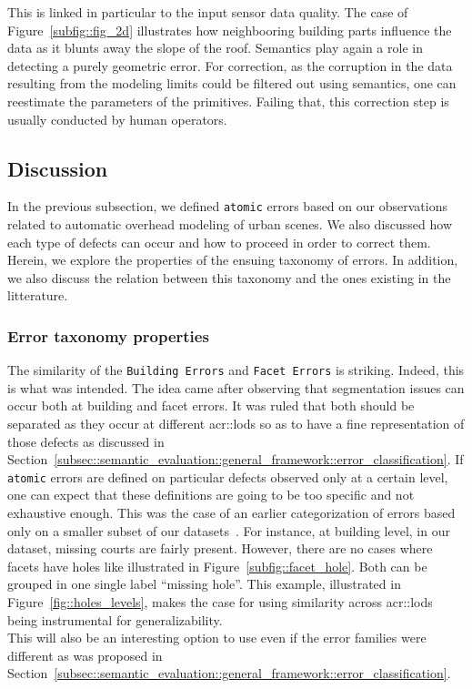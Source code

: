                 This is linked in particular to the input sensor data quality.
                The case of Figure~\ref{subfig::fig_2d} illustrates how neighbooring building parts influence the data as it blunts away the slope of the roof.
                Semantics play again a role in detecting a purely geometric error.
                For correction, as the corruption in the data resulting from the modeling limits could be filtered out using semantics, one can reestimate the parameters of the primitives.
                Failing that, this correction step is usually conducted by human operators.

    \subsection{Discussion}
        \label{subsec::semantic_evaluation::overhead::discussion}

        In the previous subsection, we defined \texttt{atomic} errors based on our observations related to automatic overhead modeling of urban scenes.
        We also discussed how each type of defects can occur and how to proceed in order to correct them.
        Herein, we explore the properties of the ensuing taxonomy of errors.
        In addition, we also discuss the relation between this taxonomy and the ones existing in the litterature.

        \subsubsection{Error taxonomy properties}
            The similarity of the \texttt{Building Errors} and \texttt{Facet Errors} is striking.
            Indeed, this is what was intended.
            The idea came after observing that segmentation issues can occur both at building and facet errors.
            It was ruled that both should be separated as they occur at different \glspl{acr::lod} so as to have a fine representation of those defects as discussed in Section~\ref{subsec::semantic_evaluation::general_framework::error_classification}.
            If \texttt{atomic} errors are defined on particular defects observed only at a certain level, one can expect that these definitions are going to be too specific and not exhaustive enough.
            This was the case of an earlier categorization of errors based only on a smaller subset of our datasets~\parencite{ennafii2018semanticunannotated}.
            For instance, at building level, in our dataset, missing courts are fairly present.
            However, there are no cases where facets have holes like illustrated in Figure~\ref{subfig::facet_hole}.
            Both can be grouped in one single label ``missing hole''.
            This example, illustrated in Figure~\ref{fig::holes_levels}, makes the case for using similarity across \glspl{acr::lod} being instrumental for generalizability.\\
            This will also be an interesting option to use even if the error families were different as was proposed in Section~\ref{subsec::semantic_evaluation::general_framework::error_classification}.\\

